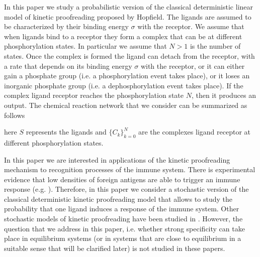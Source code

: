 \documentclass{article}
\numberwithin{equation}{section}
\theoremstyle{plain}
\begin{document}
In this paper we study a probabilistic version of the classical deterministic linear model of kinetic proofreading proposed by Hopfield. 
The ligands are assumed to be characterized by their binding energy $\sigma$ with the receptor.
We assume that when ligands bind to a receptor they form a complex that can be at different phosphorylation states. In particular we assume that $N >1$ is the number of states. Once the complex is formed the ligand can detach from the receptor, with a rate that depends on its binding energy $\sigma$ with the receptor, or it can either gain a phosphate group (i.e. a phosphorylation event takes place), or it loses an inorganic phosphate group (i.e. a dephosphorylation event takes place). 
If the complex ligand receptor reaches the phosphorylation state $N$, then it produces an output. 
The chemical reaction network that we consider can be summarized as follows
\begin{center}
\end{center}
here $S$ represents the ligands and $\{ C_k \}_{k=0}^N $ are the complexes ligand receptor at different phosphorylation states. 

In this paper we are interested in applications of the kinetic proofreading mechanism to recognition processes of the immune system. 
There is experimental evidence that low densities of foreign antigens are able to trigger an immune response (e.g. \cite{altan2005modeling}). Therefore, in this paper we consider a stochastic version of the classical deterministic kinetic proofreading model that allows to study the probability that one ligand induces a response of the immune system. 
Other stochastic models of kinetic proofreading have been studied in \cite{currie2012stochastic,kirby2024leisure,kirby2023proofreading, munsky2009specificity,xiao2024leisure}.
However, the question that we address in this paper, i.e. whether strong specificity can take place in equilibrium systems (or in systems that are close to equilibrium in a suitable sense that will be clarified later) is not studied in these papers. 
\end{document}
